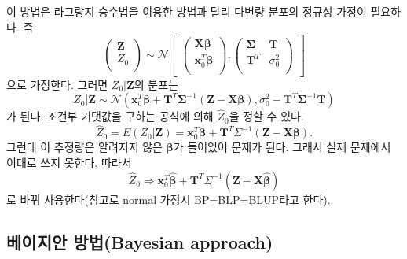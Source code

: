 \documentclass[b5paper,]{scrbook}
\theoremstyle{plain}
\theoremstyle{definition}
\numberwithin{equation}{section}
\begin{document}
이 방법은 라그랑지 승수법을 이용한 방법과 달리 다변량 분포의 정규성
가정이 필요하다. 즉 \[
\begin{pmatrix}
\mathbf{Z}\\
Z_{0}\\
\end{pmatrix}
\sim \mathcal{N}
\begin{bmatrix}
\begin{pmatrix}
\mathbf{X}\boldsymbol{\beta}\\
\mathbf{x}_{0}^{T}\boldsymbol{\beta}\\
\end{pmatrix},
\begin{pmatrix}
\boldsymbol{\Sigma} & \mathbf{T}\\
\mathbf{T}^{T} & \sigma_{0}^{2}\\
\end{pmatrix}
\end{bmatrix}
\] 으로 가정한다. 그러면 \(Z_{0}|\mathbf{Z}\)의 분포는
\[Z_{0}|\mathbf{Z} \sim \mathcal{N}(\mathbf{x}_{0}^{T}\boldsymbol{\beta}+\mathbf{T}^{T}\boldsymbol{\Sigma}^{-1}(\mathbf{Z}-\mathbf{X}\boldsymbol{\beta}), \sigma_{0}^{2}-\mathbf{T}^{T}\boldsymbol{\Sigma}^{-1}\mathbf{T})\]
가 된다. 조건부 기댓값을 구하는 공식에 의해 \(\hat{Z}_{0}\)을 정할 수
있다.
\[\hat{Z}_{0}=E(Z_{0}|\mathbf{Z})=\mathbf{x}_{0}^{T}\boldsymbol{\beta}+\mathbf{T}^{T}\Sigma^{-1}(\mathbf{Z}-\mathbf{X}\boldsymbol{\beta}).\]
그런데 이 추정량은 알려지지 않은 \(\boldsymbol{\beta}\)가 들어있어
문제가 된다. 그래서 실제 문제에서 이대로 쓰지 못한다. 따라서
\[\hat{Z}_{0}\Longrightarrow \mathbf{x}_{0}^{T}\hat{\boldsymbol{\beta}}+\mathbf{T}^{T}\Sigma^{-1}(\mathbf{Z}-\mathbf{X}\hat{\boldsymbol{\beta}})\]
로 바꿔 사용한다(참고로 normal 가정시 BP=BLP=BLUP라고 한다).

\subsection{베이지안 방법(Bayesian approach)}\label{-bayesian-approach}
\end{document}
